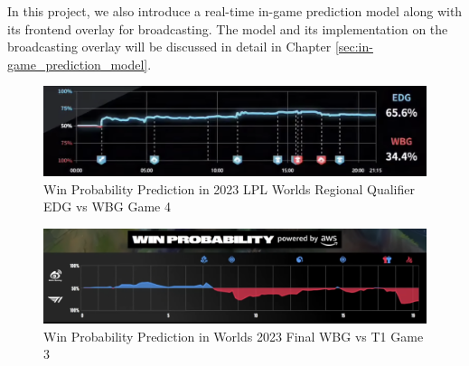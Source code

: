 \documentclass[11pt,a4paper,oneside]{report}
\begin{document}
In this project, we also introduce a real-time in-game prediction model along with its frontend overlay for broadcasting. The model and its implementation on the broadcasting overlay will be discussed in detail in Chapter \ref{sec:in-game_prediction_model}.


\begin{figure}[H]
  \centering
  \includegraphics[width=\textwidth]{assets/edg_vs_wbg_g4_wp.png}
  \caption{Win Probability Prediction in 2023 LPL Worlds Regional Qualifier EDG vs WBG Game 4 \cite{bilibili-2023}}
  \label{fig:edg_vs_wbg_g4_wp}
\end{figure}


\begin{figure}[H]
  \centering
  \includegraphics[width=\textwidth]{assets/t1_vs_wbg_g2_wp.png}
  \caption{Win Probability Prediction in Worlds 2023 Final WBG vs T1 Game 3 \cite{youtube-2023}}
  \label{fig:t1_vs_wbg_g2_wp}
\end{figure}
\end{document}
